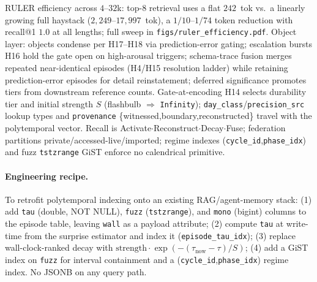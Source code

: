 RULER efficiency across $4$--$32$k: top-8 retrieval uses a flat $242$~tok vs.\ a linearly growing full haystack ($2{,}249$--$17{,}997$~tok), a $1/10$--$1/74$ token reduction with recall@1 $1.0$ at all lengths; full sweep in \texttt{figs/ruler\_efficiency.pdf}. Object layer: objects condense per H17--H18 via prediction-error gating; escalation bursts H16 hold the gate open on high-arousal triggers; schema-trace fusion merges repeated near-identical episodes (H4/H15 resolution ladder) while retaining prediction-error episodes for detail reinstatement; deferred significance promotes tiers from downstream reference counts. Gate-at-encoding H14 selects durability tier and initial strength $S$ (flashbulb $\Rightarrow$ \texttt{Infinity}); \texttt{day\_class}/\texttt{precision\_src} lookup types and \texttt{provenance} \{witnessed,boundary,reconstructed\} travel with the polytemporal vector. Recall is Activate$\cdot$Reconstruct$\cdot$Decay$\cdot$Fuse; federation partitions private/accessed-live/imported; regime indexes (\texttt{cycle\_id},\texttt{phase\_idx}) and fuzz \texttt{tstzrange} GiST enforce no calendrical primitive.

\paragraph{Engineering recipe.} To retrofit polytemporal indexing onto an existing RAG/agent-memory stack: (1) add \texttt{tau} (double, NOT NULL), \texttt{fuzz} (\texttt{tstzrange}), and \texttt{mono} (bigint) columns to the episode table, leaving \texttt{wall} as a payload attribute; (2) compute \texttt{tau} at write-time from the surprise estimator and index it (\texttt{episode\_tau\_idx}); (3) replace wall-clock-ranked decay with $\text{strength}\cdot\exp(-(\tau_{\text{now}}-\tau)/S)$; (4) add a GiST index on \texttt{fuzz} for interval containment and a (\texttt{cycle\_id},\texttt{phase\_idx}) regime index. No JSONB on any query path.